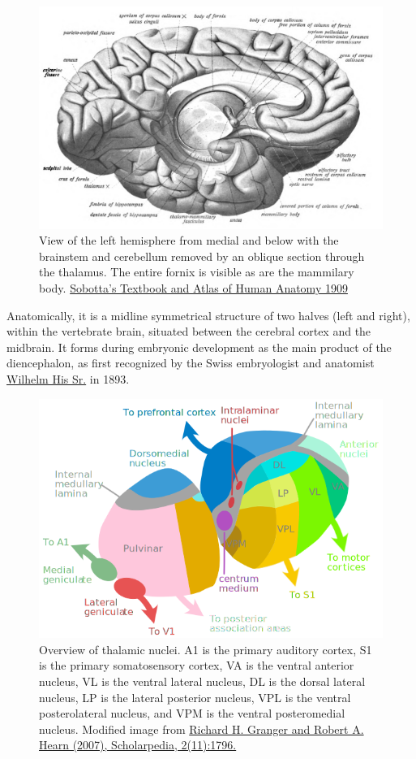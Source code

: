 \begin{figure}

{\centering \includegraphics[width=0.7\linewidth]{./figures/cns/Sobo_1909_634} 

}

\caption{View of the left hemisphere from medial and below with the brainstem and cerebellum removed by an oblique section through the thalamus. The entire fornix is visible as are the mammilary body. \href{https://commons.wikimedia.org/wiki/File:Sobo_1909_634.png}{Sobotta's Textbook and Atlas of Human Anatomy 1909}}\label{fig:thalamusview}
\end{figure}

Anatomically, it is a midline symmetrical structure of two halves (left and right), within the vertebrate brain, situated between the cerebral cortex and the midbrain. It forms during embryonic development as the main product of the diencephalon, as first recognized by the Swiss embryologist and anatomist \href{https://en.wikipedia.org/wiki/Wilhelm_His_Sr.}{Wilhelm His Sr.} in 1893.



\begin{figure}

{\centering \includegraphics[width=0.7\linewidth]{./figures/cns/Thalamus} 

}

\caption{Overview of thalamic nuclei. A1 is the primary auditory cortex, S1 is the primary somatosensory cortex, VA is the ventral anterior nucleus, VL is the ventral lateral nucleus, DL is the dorsal lateral nucleus, LP is the lateral posterior nucleus, VPL is the ventral posterolateral nucleus, and VPM is the ventral posteromedial nucleus. Modified image from \href{http://www.scholarpedia.org/article/Models_of_thalamocortical_system}{Richard H. Granger and Robert A. Hearn (2007), Scholarpedia, 2(11):1796.}}\label{fig:thalamusdetail}
\end{figure}

